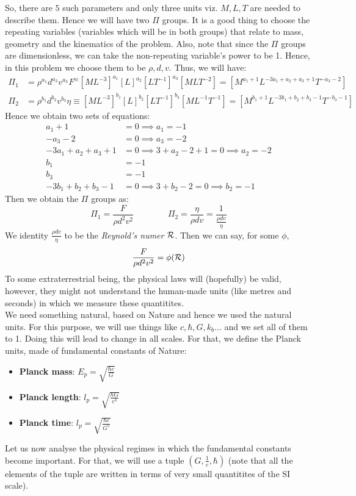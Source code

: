 So, there are $5$ such parameters and only three units viz. $M,L,T$ are needed to describe them. Hence we will have two $\Pi$ groups. It is a good thing to choose the repeating variables (variables which will be in both groups) that relate to mass, geometry and the kinematics of the problem. Also, note that since the $\Pi$ groups are dimensionless, we can take the non-repeating variable's power to be 1. Hence, in this problem we choose them to be $\rho, d, v$. Thus, we will have:
\begin{align*}
    \Pi_1 &= \rho^{a_1}d^{a_2}v^{a_3}F^\equiv [ML^{-3}]^{a_1}[L]^{a_2}[LT^{-1}]^{a_3}[MLT^{-2}] =[M^{a_1+1}L^{-3a_1+a_2+a_3+1}T^{-a_3 -2}]\\
    \Pi_2 &= \rho^{b_1}d^{b_2}v^{b_3}\eta\equiv [ML^{-3}]^{b_1}[L]^{b_2}[LT^{-1}]^{b_3} [ML^{-1}T^{-1}]=[M^{b_1+1}L^{-3b_1 + b_2+b_3-1}T^{-b_3-1}]
\end{align*}
Hence we obtain two sets of equations: 
\begin{align*}
    a_1 +1 &=0 \implies a_1 = -1\\
-a_3-2 &=0 \implies a_3 = -2\\
-3a_1+a_2+a_3 +1 &=0\implies  3 +a_2 -2+1 =0 \implies a_2 = -2\\
    b_1 &=-1\\
    b_3 &= -1\\
    -3b_1 + b_2+b_3-1 &=0\implies  3 + b_2 -2 = 0\implies b_2 = -1
\end{align*}
Then we obtain the $\Pi$ groups as: 
$$\Pi_1 = \frac{F}{\rho d^2v^2}\qquad\qquad \Pi_2 = \frac{\eta}{\rho d v} = \frac{1}{\frac{\rho d v}{\eta}}$$
We identity $\frac{\rho d v}{\eta}$ to be the \textit{Reynold's numer} $\mathcal R$. Then we can say, for some $\phi$, $$\frac{F}{\rho d^2v^2} = \phi(\mathcal R)$$ 
To some extraterrestrial being, the physical laws will (hopefully) be valid, however, they might not understand the human-made units (like metres and seconds) in which we measure these quantitites.\\[0.2cm] We need something natural, based on Nature and hence we used the natural units. For this purpose, we will use things like $c,\hbar,G,k_b\ldots$ and we set all of them to 1. Doing this will lead to change in all scales. For that, we define the Planck units, made of fundamental constants of Nature:
\begin{itemize}
    \item \textbf{Planck mass}: $E_p = \sqrt{\frac{\hbar c}{G}}$
     \item \textbf{Planck length}: $l_p = \sqrt{\frac{\hbar G}{c^3}}$
     \item \textbf{Planck time}: $l_p = \sqrt{\frac{\hbar c}{G^5}}$
\end{itemize}
Let us now analyse the physical regimes in which the fundamental constants become important. For that, we will use a tuple $(G,\frac{1}{c}, \hbar)$ (note that all the elements of the tuple are written in terms of very small quantitites of the SI scale).

